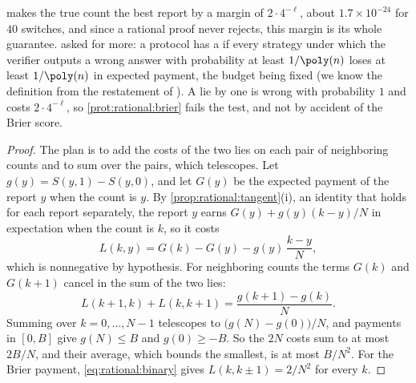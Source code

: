 \begin{refsection}
 makes the true count the best report by a margin of $2\cdot4^{-\ell}$, about $1.7\times10^{-24}$ for $40$ switches, and since a rational proof never rejects, this margin is its whole guarantee. \Textcite{GuoEtAl2014} asked for more: a protocol has a  if every strategy under which the verifier outputs a wrong answer with probability at least $1/\poly(n)$ loses at least $1/\poly(n)$ in expected payment, the budget being fixed (we know the definition from the restatement of \textcite{ChenMcCauleySingh2016}). A lie by one is wrong with probability $1$ and costs $2\cdot4^{-\ell}$, so \cref{prot:rational:brier} fails the test, and not by accident of the Brier score.


\begin{proof}
The plan is to add the costs of the two lies on each pair of neighboring counts and to sum over the pairs, which telescopes. Let $g(y)=S(y,1)-S(y,0)$, and let $G(y)$ be the expected payment of the report $y$ when the count is $y$. By \cref{prop:rational:tangent}(i), an identity that holds for each report separately, the report $y$ earns $G(y)+g(y)(k-y)/N$ in expectation when the count is $k$, so it costs
\[
L(k,y)=G(k)-G(y)-g(y)\,\frac{k-y}{N},
\]
which is nonnegative by hypothesis. For neighboring counts the terms $G(k)$ and $G(k+1)$ cancel in the sum of the two lies:
\[
L(k+1,k)+L(k,k+1)=\frac{g(k+1)-g(k)}{N}.
\]
Summing over $k=0,\dots,N-1$ telescopes to $\bigl(g(N)-g(0)\bigr)/N$, and payments in $[0,B]$ give $g(N)\le B$ and $g(0)\ge-B$. So the $2N$ costs sum to at most $2B/N$, and their average, which bounds the smallest, is at most $B/N^2$. For the Brier payment, \eqref{eq:rational:binary} gives $L(k,k\pm1)=2/N^2$ for every $k$.
\end{proof}


\end{refsection}
